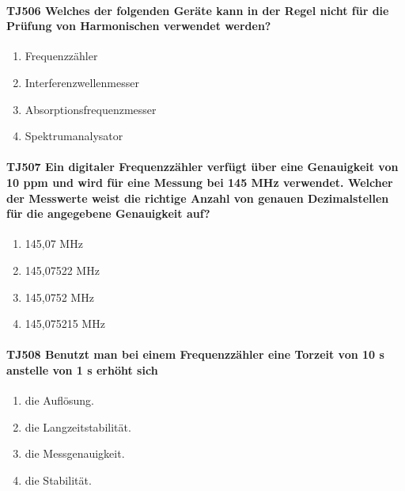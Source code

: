 \documentclass[8pt]{article}
\begin{document}
\paragraph*{TJ506 Welches der folgenden Geräte kann in der Regel nicht für die Prüfung von Harmonischen verwendet werden?}
\begin{enumerate}[nolistsep,label=\Alph*]
\item Frequenzzähler
\item Interferenzwellenmesser
\item Absorptionsfrequenzmesser
\item Spektrumanalysator
\end{enumerate}

\paragraph*{TJ507 Ein digitaler Frequenzzähler verfügt über eine Genauigkeit von 10 ppm und wird für eine Messung bei 145 MHz verwendet. Welcher der Messwerte weist die richtige Anzahl von genauen Dezimalstellen für die angegebene Genauigkeit auf?} 
\begin{enumerate}[nolistsep,label=\Alph*]
\item 145,07 MHz
\item 145,07522 MHz
\item 145,0752 MHz
\item 145,075215 MHz
\end{enumerate}

\paragraph*{TJ508 Benutzt man bei einem Frequenzzähler eine Torzeit von 10 s anstelle von 1 s erhöht sich} 
\begin{enumerate}[nolistsep,label=\Alph*]
\item die Auflösung.
\item die Langzeitstabilität.
\item die Messgenauigkeit.
\item die Stabilität.
\end{enumerate}
\end{document}
